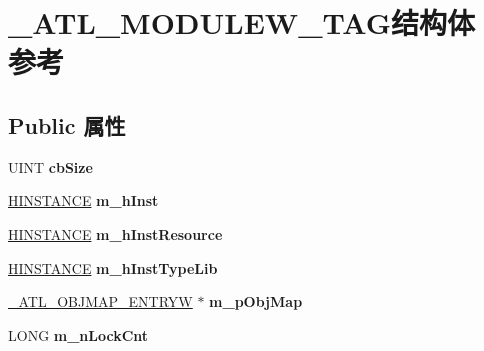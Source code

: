 \hypertarget{struct___a_t_l___m_o_d_u_l_e_w___t_a_g}{}\section{\+\_\+\+A\+T\+L\+\_\+\+M\+O\+D\+U\+L\+E\+W\+\_\+\+T\+A\+G结构体 参考}
\label{struct___a_t_l___m_o_d_u_l_e_w___t_a_g}
\subsection*{Public 属性}
\begin{DoxyCompactItemize}
\item 
\mbox{\label{struct___a_t_l___m_o_d_u_l_e_w___t_a_g_a8517931a22500ca6641bc13b73d1eef1}} 
U\+I\+NT {\bfseries cb\+Size}
\item 
\mbox{\label{struct___a_t_l___m_o_d_u_l_e_w___t_a_g_a6ba78b7657bdd6201437ae2ba4cb50d6}} 
\hyperlink{interfacevoid}{H\+I\+N\+S\+T\+A\+N\+CE} {\bfseries m\+\_\+h\+Inst}
\item 
\mbox{\label{struct___a_t_l___m_o_d_u_l_e_w___t_a_g_a374c74aec2a04804efa7de6469c9c0d7}} 
\hyperlink{interfacevoid}{H\+I\+N\+S\+T\+A\+N\+CE} {\bfseries m\+\_\+h\+Inst\+Resource}
\item 
\mbox{\label{struct___a_t_l___m_o_d_u_l_e_w___t_a_g_abe0fc35eef7d5607c6d2880c07051640}} 
\hyperlink{interfacevoid}{H\+I\+N\+S\+T\+A\+N\+CE} {\bfseries m\+\_\+h\+Inst\+Type\+Lib}
\item 
\mbox{\label{struct___a_t_l___m_o_d_u_l_e_w___t_a_g_a9a9029b781ac45b47c01bd761bad95d6}} 
\hyperlink{struct___a_t_l___o_b_j_m_a_p___e_n_t_r_y_w___t_a_g}{\+\_\+\+A\+T\+L\+\_\+\+O\+B\+J\+M\+A\+P\+\_\+\+E\+N\+T\+R\+YW} $\ast$ {\bfseries m\+\_\+p\+Obj\+Map}
\item 
\mbox{\label{struct___a_t_l___m_o_d_u_l_e_w___t_a_g_ab4192d271d24519b18452c5d4837d8ea}} 
L\+O\+NG {\bfseries m\+\_\+n\+Lock\+Cnt}
\item 
\mbox{\label{struct___a_t_l___m_o_d_u_l_e_w___t_a_g_ac710de6668b5e586fc0706eb7b86f509}} 

\end{DoxyCompactItemize}
